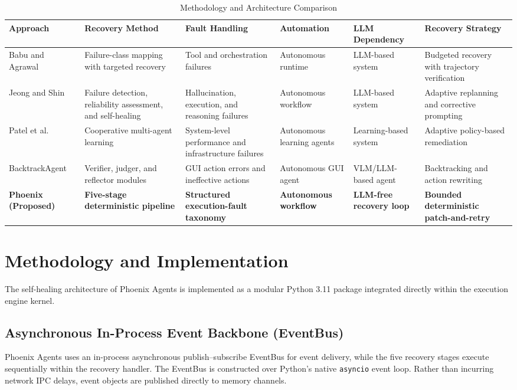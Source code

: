 \documentclass[conference]{IEEEtran}
\begin{document}
\begin{table}[t]
\centering
\caption{Methodology and Architecture Comparison}
\label{tab:architecture_comparison}
\footnotesize
\begin{tabularx}{\textwidth}{p{}Xp{}p{}p{}p{}}
\toprule
\textbf{Approach} & \textbf{Recovery Method} & \textbf{Fault Handling} & \textbf{Automation} & \textbf{LLM Dependency} & \textbf{Recovery Strategy} \\
\midrule
Babu and Agrawal~\cite{babu2026} & Failure-class mapping with targeted recovery & Tool and orchestration failures & Autonomous runtime & LLM-based system & Budgeted recovery with trajectory verification \\
Jeong and Shin~\cite{jeong2026} & Failure detection, reliability assessment, and self-healing & Hallucination, execution, and reasoning failures & Autonomous workflow & LLM-based system & Adaptive replanning and corrective prompting \\
Patel et al.~\cite{patel2026b} & Cooperative multi-agent learning & System-level performance and infrastructure failures & Autonomous learning agents & Learning-based system & Adaptive policy-based remediation \\
BacktrackAgent~\cite{wu2025} & Verifier, judger, and reflector modules & GUI action errors and ineffective actions & Autonomous GUI agent & VLM/LLM-based agent & Backtracking and action rewriting \\
\textbf{Phoenix (Proposed)} & \textbf{Five-stage deterministic pipeline} & \textbf{Structured execution-fault taxonomy} & \textbf{Autonomous workflow} & \textbf{LLM-free recovery loop} & \textbf{Bounded deterministic patch-and-retry} \\
\bottomrule
\end{tabularx}
\end{table}

\section{Methodology and Implementation}
The self-healing architecture of Phoenix Agents is implemented as a modular Python 3.11 package integrated directly within the execution engine kernel.

\subsection{Asynchronous In-Process Event Backbone (EventBus)}
Phoenix Agents uses an in-process asynchronous publish--subscribe EventBus for event delivery, while the five recovery stages execute sequentially within the recovery handler. The EventBus is constructed over Python's native \texttt{asyncio} event loop. Rather than incurring network IPC delays, event objects are published directly to memory channels.
\end{document}

